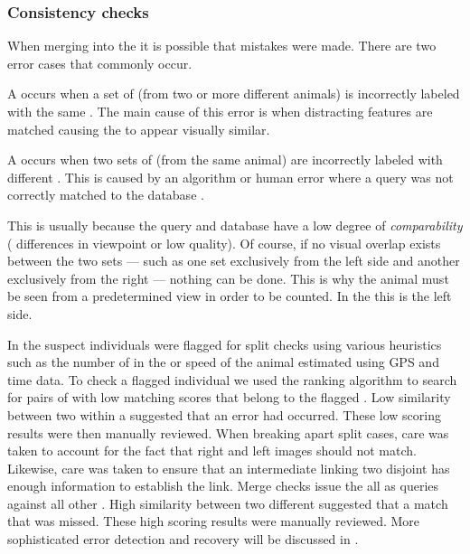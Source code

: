         \subsubsection{Consistency checks}
            When merging \encounters{} into the \masterdatabase{} it is possible that mistakes were made.  There are two
            error cases that commonly occur.
            \begin{enumln}
            \item  A  occurs when a set of \annots{} (from two or more different animals) is
            incorrectly labeled with the same \name{}.  The main cause of this error is when distracting features are
            matched causing the \annots{} to appear visually similar.
            \item A  occurs when two sets of \annots{} (from the same animal) are incorrectly
            labeled with different \names{}.  This is caused by an algorithm or human error where a query \encounter{}
            was not correctly matched to the database \exemplars{}.
            \end{enumln}
            This is usually because the query and database \annots{} have a low degree of \emph{comparability} (\eg{}
            differences in viewpoint or low quality).  Of course, if no visual overlap exists between the two sets ---
            such as one set exclusively from the left side and another exclusively from the right --- nothing can be
            done.  This is why the animal must be seen from a predetermined view in order to be counted.  In the \GZC{}
            this is the left side.

            In the \GZC{} suspect individuals were flagged for split checks using various heuristics such as the number
            of \annots{} in the \name{} or speed of the animal estimated using GPS and time data. To check a flagged
            individual we used the ranking algorithm to search for pairs of \annots{} with low matching scores that
            belong to the flagged \name{}. Low similarity between two \annots{} within a \name{} suggested that an error
            had occurred. These low scoring results were then manually reviewed. When breaking apart split cases, care
            was taken to account for the fact that right and left images should not match. Likewise, care was taken to
            ensure that an intermediate \annot{} linking two disjoint \annots{} has enough information to establish the
            link. Merge checks issue the all \exemplars{} as queries against all other \exemplars{}. High similarity
            between two different \names{} suggested that a match that was missed. These high scoring results were
            manually reviewed. More sophisticated error detection and recovery will be discussed in .

